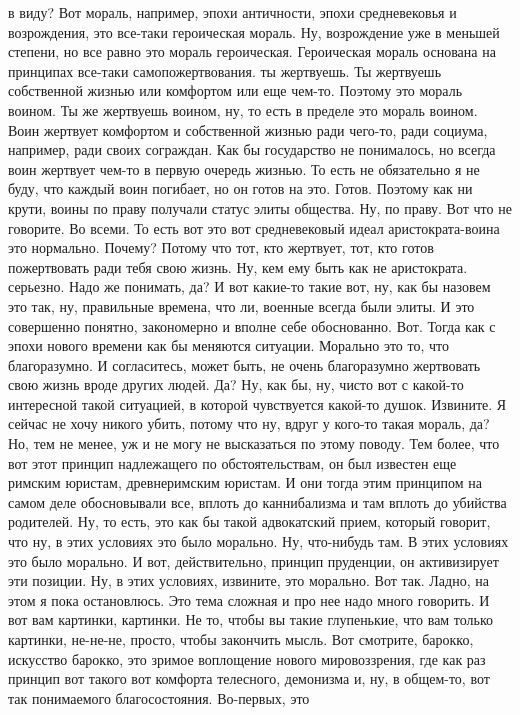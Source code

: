 в виду? Вот мораль, например, эпохи античности, эпохи средневековья и
возрождения, это все-таки героическая мораль. Ну, возрождение уже в меньшей
степени, но все равно это мораль героическая. Героическая мораль основана на
принципах все-таки самопожертвования. ты жертвуешь. Ты жертвуешь собственной
жизнью или комфортом или еще чем-то. Поэтому это мораль воином. Ты же жертвуешь
воином, ну, то есть в пределе это мораль воином. Воин жертвует комфортом и
собственной жизнью ради чего-то, ради социума, например, ради своих сограждан.
Как бы государство не понималось, но всегда воин жертвует чем-то в первую
очередь жизнью. То есть не обязательно я не буду, что каждый воин погибает, но
он готов на это. Готов. Поэтому как ни крути, воины по праву получали статус
элиты общества. Ну, по праву. Вот что не говорите. Во всеми. То есть вот это вот
средневековый идеал аристократа-воина это нормально. Почему? Потому что тот, кто
жертвует, тот, кто готов пожертвовать ради тебя свою жизнь. Ну, кем ему быть как
не аристократа. серьезно. Надо же понимать, да? И вот какие-то такие вот, ну,
как бы назовем это так, ну, правильные времена, что ли, военные всегда были
элиты. И это совершенно понятно, закономерно и вполне себе обоснованно. Вот.
Тогда как с эпохи нового времени как бы меняются ситуации. Морально это то, что
благоразумно. И согласитесь, может быть, не очень благоразумно жертвовать свою
жизнь вроде других людей. Да? Ну, как бы, ну, чисто вот с какой-то интересной
такой ситуацией, в которой чувствуется какой-то душок. Извините. Я сейчас не
хочу никого убить, потому что ну, вдруг у кого-то такая мораль, да? Но, тем не
менее, уж и не могу не высказаться по этому поводу. Тем более, что вот этот
принцип надлежащего по обстоятельствам, он был известен еще римским юристам,
древнеримским юристам. И они тогда этим принципом на самом деле обосновывали
все, вплоть до каннибализма и там вплоть до убийства родителей. Ну, то есть, это
как бы такой адвокатский прием, который говорит, что ну, в этих условиях это
было морально. Ну, что-нибудь там. В этих условиях это было морально. И вот,
действительно, принцип пруденции, он активизирует эти позиции. Ну, в этих
условиях, извините, это морально. Вот так. Ладно, на этом я пока остановлюсь.
Это тема сложная и про нее надо много говорить. И вот вам картинки, картинки. Не
то, чтобы вы такие глупенькие, что вам только картинки, не-не-не, просто, чтобы
закончить мысль. Вот смотрите, барокко, искусство барокко, это зримое воплощение
нового мировоззрения, где как раз принцип вот такого вот комфорта телесного,
демонизма и, ну, в общем-то, вот так понимаемого благосостояния. Во-первых, это
